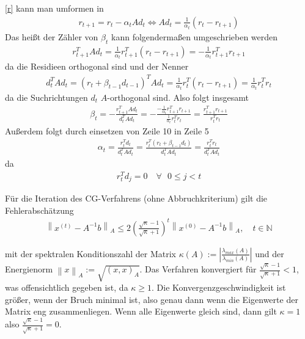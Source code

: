 \documentclass[12pt,a4paper]{scrartcl}
\numberwithin{equation}{section}
\numberwithin{myalgctr}{section}
\numberwithin{mytheoremctr}{subsection}
\numberwithin{mykorollarctr}{subsection}
\numberwithin{mylemmactr}{subsection}
\numberwithin{mybeispielctr}{subsection}
\newcommand\norm[1]{\left\lVert#1\right\rVert}
\begin{document}
	\cref{r} kann man umformen in 
	\begin{align*}
		r_{t+1} =  r_t - \alpha_tAd_t \Leftrightarrow Ad_t = \frac{1}{\alpha_t}(r_t - r_{t+1})
	\end{align*}
	Das heißt der Zähler von $\beta_t$ kann folgendermaßen umgeschrieben werden
	\begin{align*}
		r_{t+1}^{T}Ad_t = \frac{1}{\alpha_t}r_{t+1}^{T}(r_t - r_{t+1}) = -\frac{1}{\alpha_t}r_{t+1}^{T}r_{t+1}
	\end{align*}
	da die Residieen orthogonal sind und der Nenner
	\begin{align*}
		d_t^{T}Ad_t = (r_t + \beta_{t-1}d_{t-1})^{T}Ad_t =  \frac{1}{\alpha_t}r_{t}^{T}(r_t - r_{t+1}) = \frac{1}{\alpha_t}r_t^{T}r_t 
	\end{align*}
	da die Suchrichtungen $d_t$ $A$-orthogonal sind.
	Also folgt insgesamt
	\begin{align*}
		\beta_t = -\frac{r_{t+1}^{T}Ad_t}{d_t^{T}Ad_t} = -\frac{-\frac{1}{\alpha_t}r_{t+1}^{T}r_{t+1}}{\frac{1}{\alpha_t}r_t^{T}r_t } = \frac{r_{t+1}^{T}r_{t+1}}{r_t^{T}r_t }
	\end{align*}
	Außerdem folgt durch einsetzen von Zeile 10 in Zeile 5
	\begin{align*}
		\alpha_t = \frac{r_t^{T}d_t}{d_t^{T}Ad_t} = \frac{r_t^{T}(r_t + \beta_{t-1}d_t)}{d_t^{T}Ad_t} = \frac{r_t^{T}r_t}{d_t^{T}Ad_t}
	\end{align*}
	da \autocite[vgl.][100]{skript}
	\begin{align*}
		r_t^{T}d_j = 0 \quad \forall \text{ }0 \leq j < t
	\end{align*}
	
	
	
	
	Für die Iteration des CG-Verfahrens (ohne Abbruchkriterium) gilt die Fehlerabschätzung \autocite[vgl.][102]{skript}
	\begin{align*}
		\norm{x^{(t)} - A^{-1}b}_A \leq 2\left(\frac{\sqrt{\kappa} - 1}{\sqrt{\kappa} + 1}\right)^{t}\norm{x^{(0)} - A^{-1}b}_A, \quad t\in\mathbb{N}
	\end{align*}
	
	mit der spektralen Konditionszahl der Matrix $\kappa(A) := \left|\frac{\lambda_{max}(A)}{\lambda_{min}(A)}\right|$ und der Energienorm $\norm{x}_A := \sqrt{(x,x)_A}$. Das Verfahren konvergiert für $\frac{\sqrt{\kappa} - 1}{\sqrt{\kappa} + 1} < 1$, was offensichtlich gegeben ist, da $\kappa \geq 1$. Die Konvergenzgeschwindigkeit ist größer, wenn der Bruch minimal ist, also genau dann wenn die Eigenwerte der Matrix eng zusammenliegen. Wenn alle Eigenwerte gleich sind, dann gilt $\kappa = 1$ also $\frac{\sqrt{\kappa} - 1}{\sqrt{\kappa} + 1} = 0$. 
	 \label{lst:cg}
	
\end{document}
